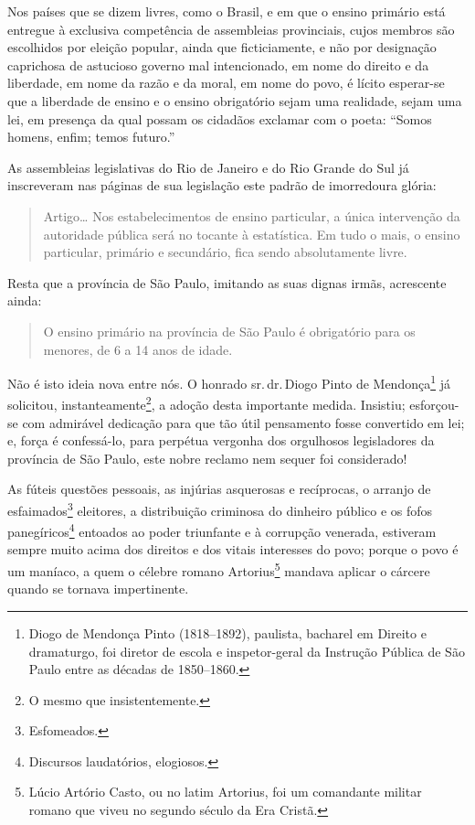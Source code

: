 Nos países que se dizem livres, como o Brasil, e em que o ensino
primário está entregue à exclusiva competência de assembleias
provinciais, cujos membros são escolhidos por eleição popular, ainda que
ficticiamente, e não por designação caprichosa de astucioso governo mal
intencionado, em nome do direito e da liberdade, em nome da razão e da
moral, em nome do povo, é lícito esperar-se que a liberdade de ensino e
o ensino obrigatório sejam uma realidade, sejam uma lei, em presença da
qual possam os cidadãos exclamar com o poeta: ``Somos homens, enfim;
temos futuro.''

As assembleias legislativas do Rio de Janeiro e do Rio Grande do Sul já
inscreveram nas páginas de sua legislação este padrão de imorredoura
glória:

\begin{quote}
Artigo\ldots{} Nos estabelecimentos de ensino particular, a única
intervenção da autoridade pública será no tocante à estatística. Em tudo
o mais, o ensino particular, primário e secundário, fica sendo
absolutamente livre.
\end{quote}

Resta que a província de São Paulo, imitando as suas dignas irmãs,
acrescente ainda:


\begin{quote}
O ensino primário na província de São Paulo é obrigatório para os
menores, de 6 a 14 anos de idade.
\end{quote}

Não é isto ideia nova entre nós. O honrado sr.\,dr.\,Diogo Pinto de
Mendonça\footnote{Diogo de Mendonça Pinto (1818--1892), paulista,
  bacharel em Direito e dramaturgo, foi diretor de escola e
  inspetor-geral da Instrução Pública de São Paulo entre as décadas de
  1850--1860.} já solicitou, instanteamente\footnote{O mesmo que
  insistentemente.}, a adoção desta importante medida. Insistiu;
esforçou-se com admirável dedicação para que tão útil pensamento fosse
convertido em lei; e, força é confessá-lo, para perpétua vergonha dos
orgulhosos legisladores da província de São Paulo, este nobre reclamo nem
sequer foi considerado!

As fúteis questões pessoais, as injúrias asquerosas e recíprocas, o
arranjo de esfaimados\footnote{Esfomeados.} eleitores, a distribuição
criminosa do dinheiro público e os fofos panegíricos\footnote{
  Discursos laudatórios, elogiosos.} entoados ao poder triunfante e à
corrupção venerada, estiveram sempre muito acima dos direitos e dos
vitais interesses do povo; porque o povo é um maníaco, a quem o célebre
romano Artorius\footnote{Lúcio Artório Casto, ou no latim Artorius,
  foi um comandante militar romano que viveu no segundo século da Era
  Cristã.} mandava aplicar o cárcere quando se tornava impertinente.

